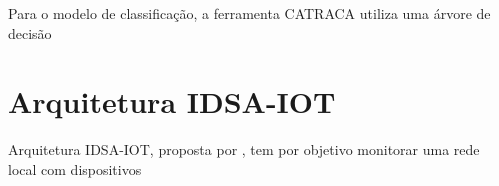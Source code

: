 Para o modelo de classificação, a ferramenta CATRACA utiliza uma árvore de decisão






\section{Arquitetura IDSA-IOT}\label{sec:cassales}

\newcommand{\idsiot}{IDSA-IOT\xspace}

Arquitetura IDSA-IOT, proposta por , tem por objetivo
monitorar uma rede local com dispositivos

